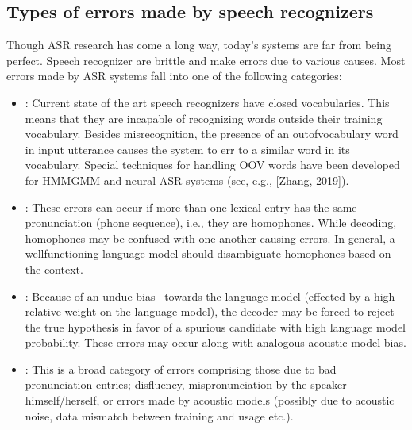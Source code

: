 \documentclass[letterpaper,10pt,english]{jupyterBook}
\begin{document}
\subsection{Types of errors made by speech recognizers}
\label{\detokenize{Recognition/Speech_Recognition:types-of-errors-made-by-speech-recognizers}}
\sphinxAtStartPar
Though ASR research has come a long way, today’s systems are far from
being perfect. Speech recognizer are brittle and make errors due to
various causes. Most errors made by ASR systems fall into one of the
following categories:
\begin{itemize}
\item {} 
\sphinxAtStartPar
{}: Current state of the art speech
recognizers have closed vocabularies. This means that they are
incapable of recognizing words outside their training vocabulary.
Besides misrecognition, the presence of an out\sphinxhyphen{}of\sphinxhyphen{}vocabulary word in
input utterance causes the system to err to a similar word in its
vocabulary. Special techniques for handling OOV words have been
developed for HMM\sphinxhyphen{}GMM and neural ASR systems (see, e.g., {[}\hyperlink{cite.References:id45}{Zhang, 2019}{]}).

\item {} 
\sphinxAtStartPar
{}: These errors can occur if more than one
lexical entry has the same pronunciation (phone sequence), i.e.,
they are homophones. While decoding, homophones may be confused with
one another causing errors. In general, a well\sphinxhyphen{}functioning language
model should disambiguate homophones based on the context.

\item {} 
\sphinxAtStartPar
{}: Because of an undue bias  towards the
language model (effected by a high relative weight on the language
model), the decoder may be forced to reject the true hypothesis in
favor of a spurious candidate with high language model probability.
These errors may occur along with analogous acoustic model bias.

\item {} 
\sphinxAtStartPar
{}: This is a broad category of errors
comprising those due to bad pronunciation entries; disfluency,
mispronunciation by the speaker himself/herself, or errors made by
acoustic models (possibly due to acoustic noise, data mismatch
between training and usage etc.).

\end{itemize}
\end{document}
